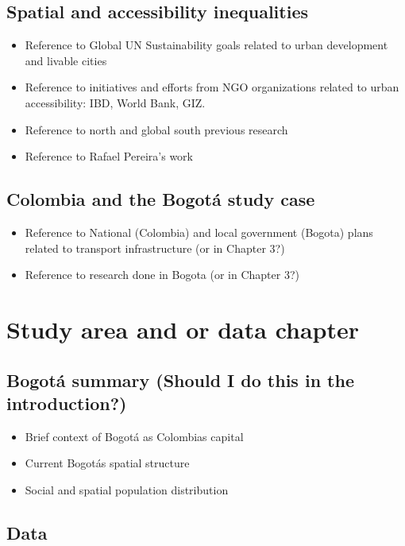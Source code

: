 \documentclass[12pt, a4paper]{report}
\begin{document}
\section{Spatial and accessibility inequalities}

\begin{itemize}
  \item Reference to Global UN Sustainability goals related to urban development and livable cities
  \item Reference to initiatives and efforts from NGO organizations related to urban accessibility: IBD, World Bank, GIZ.
  \item Reference to north and global south previous research
  \item Reference to Rafael Pereira's work
\end{itemize}

\section{Colombia and the Bogot\'{a} study case}

\begin{itemize}
  \item Reference to National (Colombia) and local government (Bogota) plans related to transport infrastructure (or in Chapter 3?)
  \item Reference to research done in Bogota (or in Chapter 3?)
\end{itemize}

\chapter{Study area and or data chapter} \label{Chap3}

\section{Bogot\'{a} summary (Should I do this in the introduction?)}

\begin{itemize}
  \item Brief context of Bogot\'{a} as Colombia\textquotesingle s capital
  \item Current Bogot\'{a}\textquotesingle s spatial structure
  \item Social and spatial population distribution
\end{itemize}

\section{Data}
\end{document}
